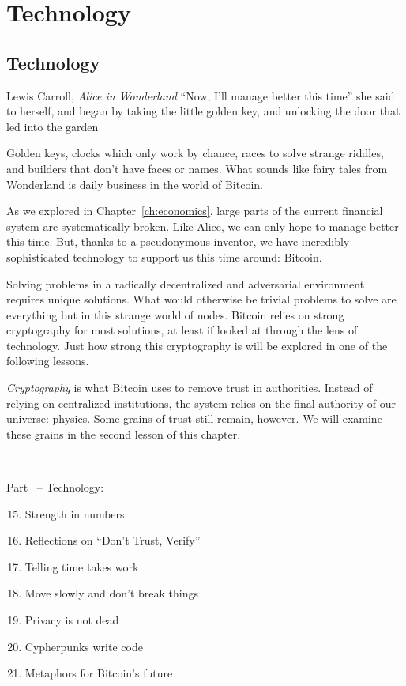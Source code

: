 \part{Technology}
\label{ch:technology}
\chapter*{Technology}

\begin{chapquote}{Lewis Carroll, \textit{Alice in Wonderland}}
\enquote{Now, I'll manage better this time} she said to herself, and began by taking
the little golden key, and unlocking the door that led into the garden
\end{chapquote}

Golden keys, clocks which only work by chance, races to solve
strange riddles, and builders that don't have faces or names. What sounds like
fairy tales from Wonderland is daily business in the world of Bitcoin.

As we explored in Chapter~\ref{ch:economics}, large parts of the current financial
system are systematically broken. Like Alice, we can only hope to manage better
this time. But, thanks to a pseudonymous inventor, we have incredibly
sophisticated technology to support us this time around: Bitcoin.

Solving problems in a radically decentralized and adversarial environment
requires unique solutions. What would otherwise be trivial problems to solve
are everything but in this strange world of nodes. Bitcoin relies on strong
cryptography for most solutions, at least if looked at through the lens of
technology. Just how strong this cryptography is will be explored in one of the
following lessons.

\textit{Cryptography} is what Bitcoin uses to remove trust in authorities.
Instead of relying on centralized institutions, the system relies on the final
authority of our universe: physics. Some grains of trust still remain, however.
We will examine these grains in the second lesson of this chapter.

~

\begin{samepage}
Part~\ref{ch:technology} -- Technology:

\begin{enumerate}
  \setcounter{enumi}{14}
  \item Strength in numbers
  \item Reflections on \enquote{Don't Trust, Verify}
  \item Telling time takes work
  \item Move slowly and don't break things
  \item Privacy is not dead
  \item Cypherpunks write code
  \item Metaphors for Bitcoin's future
\end{enumerate}
\end{samepage}

